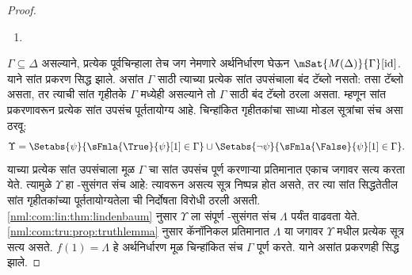 \begin{proof}
\begin{enumerate}
{      $\sFmla{\False}{\indfrm}[\sigma] \in \Delta$
      असेल, तर शाखा संपूर्ण असल्याने
      काही $\sigma.n$ साठी
      $\sFmla{\False}{\psi}[\sigma.n] \in \Delta$.
      आगमनाच्या गृहीतकानुसार
      $\mSat/{M(\Delta)}{\psi}[\sigma.n]$.
      $R\sigma(\sigma.n)$ असल्याने
      $\mSat/{M(\Delta)}{\psi}[\sigma']$
      होईल असे~$\sigma'$ असते. म्हणून
      $\mSat/{M(\Delta)}{\indfrm}[\sigma]$.}
  \item {}
\end{enumerate}
$\Gamma \subseteq \Delta$ असल्याने, प्रत्येक पूर्वचिन्हाला तेच जग
नेमणारे अर्थनिर्धारण घेऊन $\mSat{M(\Delta)}{\Gamma}[\mathrm{id}]$.
याने सांत प्रकरण सिद्ध झाले.
असांत $\Gamma$ साठी त्याच्या प्रत्येक सांत उपसंचाला बंद टॅब्लो
नसतो: तसा टॅब्लो असता, तर त्याची सांत गृहीतके $\Gamma$
मध्येही असल्याने तो $\Gamma$ साठी बंद टॅब्लो ठरला असता.
म्हणून सांत प्रकरणावरून प्रत्येक सांत उपसंच पूर्ततायोग्य आहे.
चिन्हांकित गृहीतकांचा साध्या मोडल सूत्रांचा संच असा ठरवू:
\[\Upsilon = \Setabs{\psi}{\sFmla{\True}{\psi}[1]\in\Gamma}
\cup \Setabs{\lnot\psi}{\sFmla{\False}{\psi}[1]\in\Gamma}.
\]
याच्या प्रत्येक सांत उपसंचाला मूळ $\Gamma$ चा सांत उपसंच
पूर्ण करणाऱ्या प्रतिमानात एकाच जगावर सत्य करता येते.
त्यामुळे $\Upsilon$ हा -सुसंगत संच आहे: त्यावरून
असत्य सूत्र निष्पन्न होत असते, तर त्या सांत सिद्धतेतील सांत
गृहीतकांच्या पूर्ततायोग्यतेला  ची निर्दोषता विरोधी ठरली
असती. \ref{nml:com:lin:thm:lindenbaum} नुसार
$\Upsilon$ ला संपूर्ण -सुसंगत संच $\Lambda$ पर्यंत
वाढवता येते. \ref{nml:com:tru:prop:truthlemma} नुसार
कॅनॉनिकल प्रतिमानात $\Lambda$ या जगावर $\Upsilon$ मधील
प्रत्येक सूत्र सत्य असते. $f(1)=\Lambda$ हे अर्थनिर्धारण मूळ
चिन्हांकित संच $\Gamma$ पूर्ण करते. याने असांत प्रकरणही सिद्ध झाले.
\end{proof}

